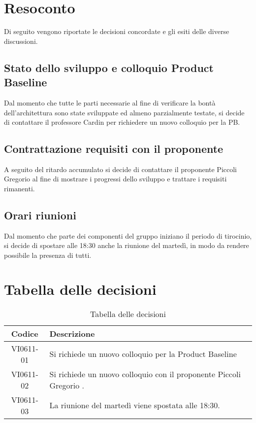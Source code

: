 \documentclass{article}
\begin{document}
\newpage
\section{Resoconto}
\label{sec:resoconto}

Di seguito vengono riportate le decisioni concordate e gli esiti delle diverse discussioni.

\subsection{Stato dello sviluppo e colloquio Product Baseline}
\label{itm:1}
Dal momento che tutte le parti necessarie al fine di verificare la bontà dell'architettura sono state sviluppate ed almeno parzialmente testate, si decide di contattare il professore Cardin per richiedere un nuovo colloquio per la PB.

\subsection{Contrattazione requisiti con il proponente}
\label{itm:2}
A seguito del ritardo accumulato si decide di contattare il proponente Piccoli Gregorio al fine di mostrare i progressi dello sviluppo e trattare i requisiti rimanenti.

\subsection{Orari riunioni}
\label{itm:3}
Dal momento che parte dei componenti del gruppo iniziano il periodo di tirocinio, si decide di spostare alle 18:30 anche la riunione del martedì, in modo da rendere possibile la presenza di tutti.


\section{Tabella delle decisioni}%
\label{sub:decisioni}

\begin{table}[!ht]
	\centering
	\begin{tabular}{|c|p{13cm}|}
		\hline
		\rowcolor{lightgray}
		\textbf{Codice} & \textbf{Descrizione} \\
		\hline
			VI0611-01 & Si richiede un nuovo colloquio per la Product Baseline \\
            		VI0611-02 & Si richiede un nuovo colloquio con il proponente Piccoli Gregorio .\\
			VI0611-03 & La riunione del martedì viene spostata alle 18:30. \\
		\hline
	\end{tabular}
	\caption{Tabella delle decisioni}
\end{table}
\end{document}
